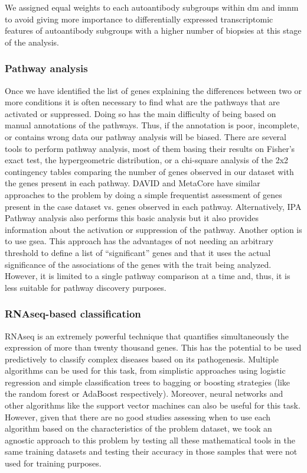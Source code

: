We assigned equal weights to each autoantibody subgroups within \gls{dm} and  \gls{imnm} to avoid giving more importance to differentially expressed transcriptomic features of autoantibody subgroups with a higher number of biopsies at this stage of the analysis.

\subsubsection{Pathway analysis}
Once we have identified the list of genes explaining the differences between two or more conditions it is often necessary to find what are the pathways that are activated or suppressed. Doing so has the main difficulty of being based on manual annotations of the pathways. Thus, if the annotation is poor, incomplete, or contains wrong data our pathway analysis will be biased. There are several tools to perform pathway analysis, most of them basing their results on Fisher’s exact test, the hypergeometric distribution, or a chi-square analysis of the 2x2 contingency tables comparing the number of genes observed in our dataset with the genes present in each pathway. DAVID and MetaCore have similar approaches to the problem by doing a simple frequentist assessment of genes present in the case dataset vs. genes observed in each pathway. Alternatively, IPA Pathway analysis also performs this basic analysis but it also provides information about the activation or suppression of the pathway. Another option is to use \gls{gsea}. This approach has the advantages of not needing an arbitrary threshold to define a list of “significant” genes and that it uses the actual significance of the associations of the genes with the trait being analyzed. However, it is limited to a single pathway comparison at a time and, thus, it is less suitable for pathway discovery purposes.

\subsubsection{RNAseq-based classification}
RNAseq is an extremely powerful technique that quantifies simultaneously the expression of more than twenty thousand genes. This has the potential to be used predictively to classify complex diseases based on its pathogenesis. Multiple algorithms can be used for this task, from simplistic approaches using logistic regression and simple classification trees to bagging or boosting strategies (like the random forest or AdaBoost respectively). Moreover, neural networks and other algorithms like the support vector machines can also be useful for this task. However, given that there are no good studies assessing when to use each algorithm based on the characteristics of the problem dataset, we took an agnostic approach to this problem by testing all these mathematical tools in the same training datasets and testing their accuracy in those samples that were not used for training purposes.

